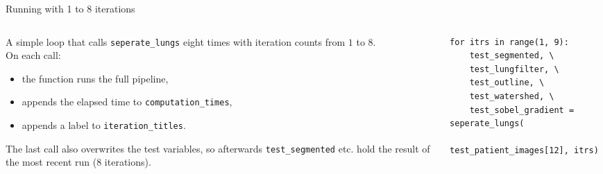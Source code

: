 \documentclass[10pt,aspectratio=169]{beamer}
\begin{document}
\begin{frame}[fragile]{Running with 1 to 8 iterations}
\begin{columns}[T,onlytextwidth]
\begin{column}{0.42\textwidth}
\small
A simple loop that calls \texttt{seperate\_lungs} eight times with iteration counts from $1$ to $8$.\\[0.4em]
On each call:
\begin{itemize}
  \item the function runs the full pipeline,
  \item appends the elapsed time to \texttt{computation\_times},
  \item appends a label to \texttt{iteration\_titles}.
\end{itemize}
The last call also overwrites the test variables, so afterwards \texttt{test\_segmented} etc. hold the result of the most recent run (8 iterations).
\end{column}
\begin{column}{0.56\textwidth}
\begin{lstlisting}[firstnumber=190]
for itrs in range(1, 9):
    test_segmented, \
    test_lungfilter, \
    test_outline, \
    test_watershed, \
    test_sobel_gradient = seperate_lungs(
        test_patient_images[12], itrs)
\end{lstlisting}
\end{column}
\end{columns}
\end{frame}
\end{document}
